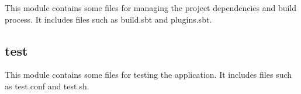 This module contains some files for managing the project dependencies and build process. It includes files such as build.sbt and plugins.sbt.

\subsection{test}

This module contains some files for testing the application. It includes files such as test.conf and test.sh.




